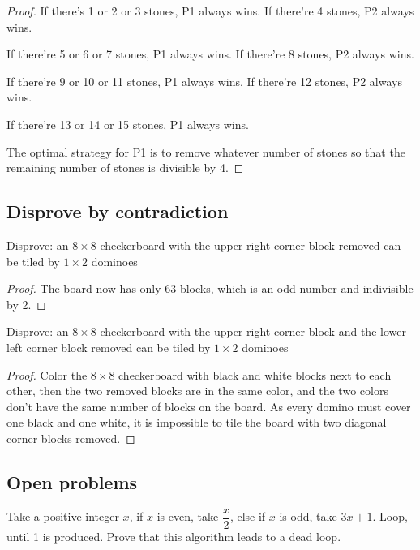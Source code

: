 \begin{proof}

If there's 1 or 2 or 3 stones, P1 always wins. If there're 4 stones, P2 always wins.

If there're 5 or 6 or 7 stones, P1 always wins. If there're 8 stones, P2 always wins.

If there're 9 or 10 or 11 stones, P1 always wins. If there're 12 stones, P2 always wins.

If there're 13 or 14 or 15 stones, P1 always wins.

The optimal strategy for P1 is to remove whatever number of stones so that the remaining number of stones is divisible by 4.

\end{proof}

\subsection{Disprove by contradiction}

\begin{ex}

Disprove: an $8 \times 8$ checkerboard with the upper-right corner block removed can be tiled by $1 \times 2$ dominoes

\end{ex}

\begin{proof}

The board now has only 63 blocks, which is an odd number and indivisible by 2.

\end{proof} 

\begin{ex}

Disprove: an $8 \times 8$ checkerboard with the upper-right corner block and the lower-left corner block removed can be tiled by $1 \times 2$ dominoes

\end{ex}

\begin{proof}

Color the $8 \times 8$ checkerboard with black and white blocks next to each other, then the two removed blocks are in the same color, and the two colors don't have the same number of blocks on the board. As every domino must cover one black and one white, it is impossible to tile the board with two diagonal corner blocks removed.

\end{proof}

\subsection{Open problems}

\begin{ex}

Take a positive integer $x$, if $x$ is even, take $\dfrac{x}{2}$, else if $x$ is odd, take $3x + 1$. Loop, until 1 is produced. Prove that this algorithm leads to a dead loop.

\end{ex}